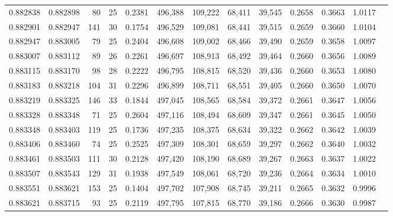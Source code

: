 \begin{tabular}{rrrrrrrrrrrrr}
0.882838 & 0.882898 &    80 &  25 &                                     0.2381 & 496,388 & 109,222 &  68,411 &  39,545 & 0.2658 & 0.3663 & 1.0117 \\
0.882901 & 0.882947 &   141 &  30 &                                     0.1754 & 496,529 & 109,081 &  68,441 &  39,515 & 0.2659 & 0.3660 & 1.0104 \\
0.882947 & 0.883005 &    79 &  25 &                                     0.2404 & 496,608 & 109,002 &  68,466 &  39,490 & 0.2659 & 0.3658 & 1.0097 \\
0.883007 & 0.883112 &    89 &  26 &                                     0.2261 & 496,697 & 108,913 &  68,492 &  39,464 & 0.2660 & 0.3656 & 1.0089 \\
0.883115 & 0.883170 &    98 &  28 &                                     0.2222 & 496,795 & 108,815 &  68,520 &  39,436 & 0.2660 & 0.3653 & 1.0080 \\
0.883183 & 0.883218 &   104 &  31 &                                     0.2296 & 496,899 & 108,711 &  68,551 &  39,405 & 0.2660 & 0.3650 & 1.0070 \\
0.883219 & 0.883325 &   146 &  33 &                                     0.1844 & 497,045 & 108,565 &  68,584 &  39,372 & 0.2661 & 0.3647 & 1.0056 \\
0.883328 & 0.883348 &    71 &  25 &                                     0.2604 & 497,116 & 108,494 &  68,609 &  39,347 & 0.2661 & 0.3645 & 1.0050 \\
0.883348 & 0.883403 &   119 &  25 &                                     0.1736 & 497,235 & 108,375 &  68,634 &  39,322 & 0.2662 & 0.3642 & 1.0039 \\
0.883406 & 0.883460 &    74 &  25 &                                     0.2525 & 497,309 & 108,301 &  68,659 &  39,297 & 0.2662 & 0.3640 & 1.0032 \\
0.883461 & 0.883503 &   111 &  30 &                                     0.2128 & 497,420 & 108,190 &  68,689 &  39,267 & 0.2663 & 0.3637 & 1.0022 \\
0.883507 & 0.883543 &   129 &  31 &                                     0.1938 & 497,549 & 108,061 &  68,720 &  39,236 & 0.2664 & 0.3634 & 1.0010 \\
0.883551 & 0.883621 &   153 &  25 &                                     0.1404 & 497,702 & 107,908 &  68,745 &  39,211 & 0.2665 & 0.3632 & 0.9996 \\
0.883621 & 0.883715 &    93 &  25 &                                     0.2119 & 497,795 & 107,815 &  68,770 &  39,186 & 0.2666 & 0.3630 & 0.9987 \\

\end{tabular}
